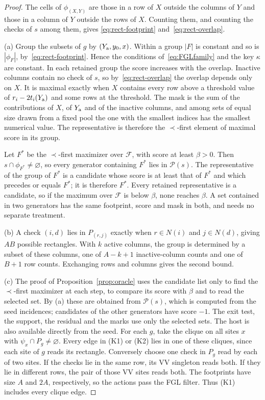 \documentclass[10pt,twocolumn]{article}
\theoremstyle{definition}
\newcommand{\FF}{\mathcal{F}}
\begin{document}
\begin{proof}
The cells of $\phi_{(X,Y)}$ are those in a row of $X$ outside the
columns of $Y$ and those in a column of $Y$ outside the rows of $X$.
Counting them, and counting the checks of $s$ among them, gives
\eqref{eq:rect-footprint} and~\eqref{eq:rect-overlap}.

(a) Group the subsets of $g$ by $(Y_{\rm a},y_0,x)$. Within a group
$|F|$ is constant and so is $|\phi_F|$, by~\eqref{eq:rect-footprint}.
Hence the conditions of~\eqref{eq:FGLfamily} and the key $\kappa$ are
constant. In each retained group the score increases with the overlap.
Inactive columns
contain no check of $s$, so by~\eqref{eq:rect-overlap} the overlap
depends only on $X$. It is maximal exactly when $X$ contains every row
above a threshold value of $r_i-2t_i(Y_{\rm a})$ and some rows at the
threshold. The mask is the sum of the contributions of $X$, of
$Y_{\rm a}$ and of the inactive columns, and among sets of equal size
drawn from a fixed pool the one with the smallest indices has the
smallest numerical value. The representative is therefore the
$\prec$-first element of maximal score in its group.

Let $F^\ast$ be the $\prec$-first maximizer over $\FF$, with score at
least $\beta>0$. Then $s\cap\phi_{F^\ast}\neq\varnothing$, so every
generator containing $F^\ast$ lies in $\mathcal P(s)$. The
representative of the group of $F^\ast$ is a candidate whose score is at
least that of $F^\ast$ and which precedes or equals $F^\ast$; it is
therefore $F^\ast$. Every retained representative is a candidate,
so if the maximum over $\FF$ is below $\beta$, none reaches $\beta$. A set contained
in two generators has the same footprint, score and mask in both, and
needs no separate treatment.

(b) A check $(i,d)$ lies in $P_{(r,j)}$ exactly when $r\in N(i)$
and $j\in N(d)$, giving $AB$ possible rectangles. With $k$ active
columns, the group is determined by a subset of these columns, one of
$A-k+1$ inactive-column counts and one of $B+1$ row counts.
Exchanging rows and columns gives the second bound.

(c) The proof of Proposition~\ref{prop:oracle} uses the candidate list
only to find the $\prec$-first maximizer at each step, to compare its
score with $\beta$ and to read the selected set. By (a) these are
obtained from $\mathcal P(s)$, which is computed from the seed
incidences; candidates of the other generators have score $-1$. The
exit test, the support, the residual and the marks use only the selected
sets. The host is also available directly from the seed.
For each $g$, take the clique on all sites $x$ with
$\psi_x\cap P_g\ne\varnothing$. Every edge in (K1) or (K2) lies in
one of these cliques, since each site of $g$ reads its rectangle.
Conversely choose one check in $P_g$ read by each of two sites.
If the checks lie in the same row, its VV singleton reads both.
If they lie in different rows, the pair of those VV sites reads
both. The footprints have size $A$ and $2A$, respectively, so the
actions pass the FGL filter. Thus (K1) includes every clique edge.
\end{proof}
\end{document}
